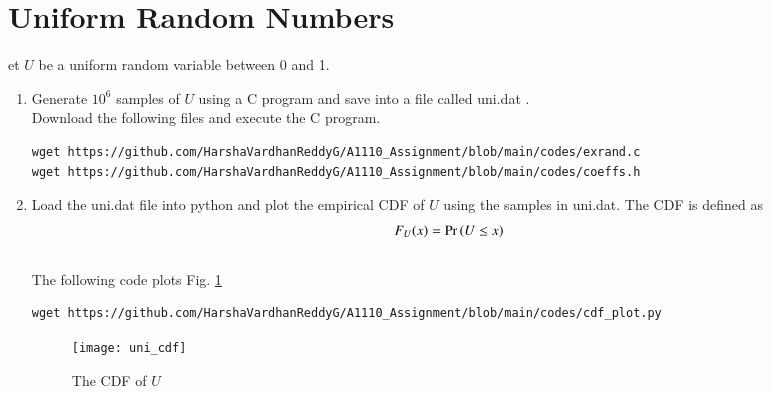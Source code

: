 \documentclass[journal,12pt,twocolumn]{IEEEtran}
\renewcommand\thesection{\arabic{section}}
\begin{document}
\section{Uniform Random Numbers}
et $U$ be a uniform random variable between 0 and 1.
\begin{enumerate}[label=\thesection.\arabic*
,ref=\thesection.\theenumi]
\item Generate $10^6$ samples of $U$ using a C program and save into a file called uni.dat .
\\
\solution Download the following files and execute the  C program.
\begin{lstlisting}
wget https://github.com/HarshaVardhanReddyG/A1110_Assignment/blob/main/codes/exrand.c
wget https://github.com/HarshaVardhanReddyG/A1110_Assignment/blob/main/codes/coeffs.h
\end{lstlisting}
%
\item
Load the uni.dat file into python and plot the empirical CDF of $U$ using the samples in uni.dat. The CDF is defined as
\begin{align}
F_{U}(x) = \Pr\left(U \le x\right)
\end{align}
\\
\solution  The following code plots Fig. \ref{fig:uni_cdf}
\begin{lstlisting}
wget https://github.com/HarshaVardhanReddyG/A1110_Assignment/blob/main/codes/cdf_plot.py
\end{lstlisting}
\begin{figure}
\centering
\texttt{[image: uni\_cdf]}
\caption{The CDF of $U$}
\label{fig:uni_cdf}
\end{figure}


\end{enumerate}
\end{document}
